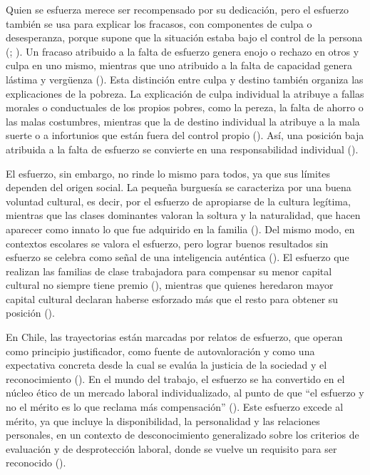 \documentclass[
  spanish,
  a4paper,
  oneside]{scrbook}
\begin{document}
Quien se esfuerza merece ser recompensado por su dedicación, pero el
esfuerzo también se usa para explicar los fracasos, con componentes de
culpa o desesperanza, porque supone que la situación estaba bajo el
control de la persona (;
). Un fracaso atribuido a la falta de esfuerzo genera enojo
o rechazo en otros y culpa en uno mismo, mientras que uno atribuido a la
falta de capacidad genera lástima y vergüenza
(). Esta
distinción entre culpa y destino también organiza las explicaciones de
la pobreza. La explicación de culpa individual la atribuye a fallas
morales o conductuales de los propios pobres, como la pereza, la falta
de ahorro o las malas costumbres, mientras que la de destino individual
la atribuye a la mala suerte o a infortunios que están fuera del control
propio (). Así, una posición baja atribuida a la falta de esfuerzo se
convierte en una responsabilidad individual
().

El esfuerzo, sin embargo, no rinde lo mismo para todos, ya que sus
límites dependen del origen social. La pequeña burguesía se caracteriza
por una buena voluntad cultural, es decir, por el esfuerzo de apropiarse
de la cultura legítima, mientras que las clases dominantes valoran la
soltura y la naturalidad, que hacen aparecer como innato lo que fue
adquirido en la familia
(). Del mismo
modo, en contextos escolares se valora el esfuerzo, pero lograr buenos
resultados sin esfuerzo se celebra como señal de una inteligencia
auténtica (). El esfuerzo que realizan las familias de clase
trabajadora para compensar su menor capital cultural no siempre tiene
premio (),
mientras que quienes heredaron mayor capital cultural declaran haberse
esforzado más que el resto para obtener su posición
().

En Chile, las trayectorias están marcadas por relatos de esfuerzo, que
operan como principio justificador, como fuente de autovaloración y como
una expectativa concreta desde la cual se evalúa la justicia de la
sociedad y el reconocimiento
(). En el mundo del trabajo, el esfuerzo se ha
convertido en el núcleo ético de un mercado laboral individualizado, al
punto de que ``el esfuerzo y no el mérito es lo que reclama más
compensación'' ().
Este esfuerzo excede al mérito, ya que incluye la disponibilidad, la
personalidad y las relaciones personales, en un contexto de
desconocimiento generalizado sobre los criterios de evaluación y de
desprotección laboral, donde se vuelve un requisito para ser reconocido
().
\end{document}
